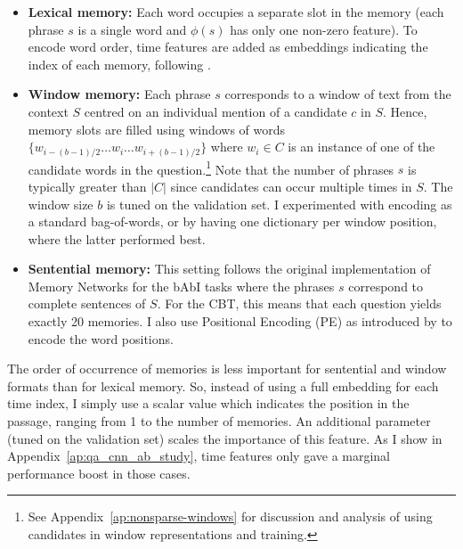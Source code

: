 \begin{itemize}  %

\item {\bf Lexical memory:} Each word occupies a separate slot in the memory (each phrase \(s\) is a single word and \(\phi(s)\) has only one non-zero feature). To encode word order, time features are added as embeddings indicating the index of each memory, following \cite{sukhbaatar2015end}. 

\item {\bf Window memory:} Each phrase \(s\) corresponds to a window of text from the context $S$ centred on an individual mention of a candidate $c$ in $S$. Hence, memory slots are filled using windows of words \(\{ w_{i-(b-1)/2} \dots w_i \dots w_{i+(b-1)/2} \} \) where \(w_i\in C\) is an instance of one of the candidate words in the question.\footnote{See Appendix~\ref{ap:nonsparse-windows} for discussion and analysis of using candidates in window representations and training.}
 Note that the number of phrases \(s\) is typically greater than $|C|$ since candidates can occur multiple times in $S$. The window size \(b\) is tuned on the validation set. 
I experimented with encoding as a standard bag-of-words, or
 by having one dictionary per window position, where the latter performed best.
%

\item {\bf Sentential memory:} This setting follows the original implementation of Memory Networks for the bAbI tasks where the phrases \(s\) correspond to complete sentences of $S$.  For the CBT, this means that each question yields exactly 20 memories. I also use Positional Encoding (PE) as introduced by \cite{sukhbaatar2015end} to encode the word positions. 
\end{itemize}

The order of occurrence of memories is less important for sentential and window formats than for lexical memory. So, instead of using a full embedding for each time index, I simply use a scalar value which indicates the position in the passage, ranging from 1 to the number of memories. An additional parameter (tuned on the validation set) scales the importance of this feature. As I show in Appendix~\ref{ap:qa_cnn_ab_study}, time features only gave a marginal performance boost in those cases.

